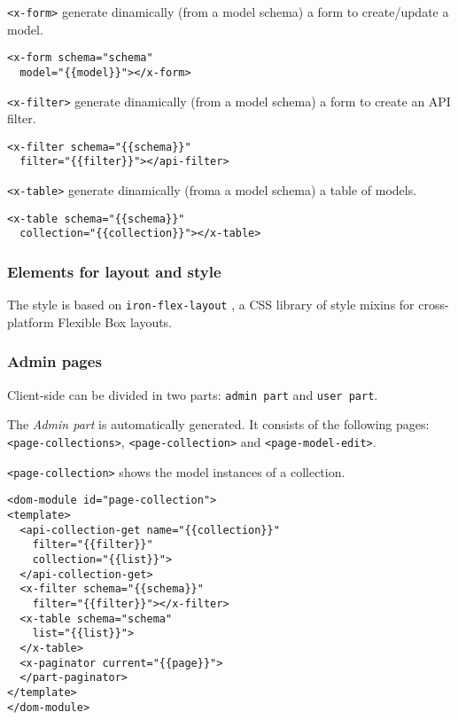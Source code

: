 \texttt{<x-form>} generate dinamically (from a model schema) a form to create/update a model.

\begin{lstlisting}[language=HTML5]
<x-form schema="schema" 
  model="{{model}}"></x-form>
\end{lstlisting}

\texttt{<x-filter>} generate dinamically (from a model schema) a form to create an API filter.

\begin{lstlisting}[language=HTML5]
<x-filter schema="{{schema}}"
  filter="{{filter}}"></api-filter>
\end{lstlisting}

\texttt{<x-table>} generate dinamically (froma a model schema) a table of models. 

\begin{lstlisting}[language=HTML5]
<x-table schema="{{schema}}" 
  collection="{{collection}}"></x-table>
\end{lstlisting}

\subsubsection{Elements for layout and style}

The style is based on \texttt{iron-flex-layout} \cite{iron-elements}, a CSS library of style mixins for cross-platform Flexible Box \cite{css-flexbox} layouts.




\subsubsection{Admin pages}

Client-side can be divided in two parts: \texttt{admin part} and \texttt{user part}.

The \emph{Admin part} is automatically generated. 
It consists of the following pages: \texttt{<page-collections>}, \texttt{<page-collection>} and \texttt{<page-model-edit>}.


\texttt{<page-collection>} shows the model instances of a collection.

\begin{lstlisting}[language=HTML5]
<dom-module id="page-collection">
<template>
  <api-collection-get name="{{collection}}" 
    filter="{{filter}}"
    collection="{{list}}">
  </api-collection-get>
  <x-filter schema="{{schema}}"
    filter="{{filter}}"></x-filter>
  <x-table schema="schema" 
    list="{{list}}">
  </x-table>
  <x-paginator current="{{page}}">
  </part-paginator>
</template>
</dom-module>
\end{lstlisting}

